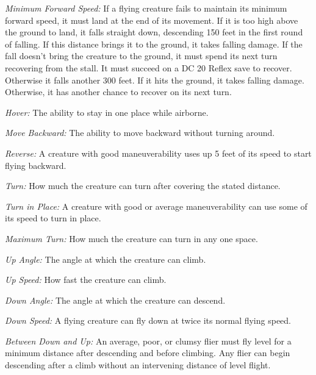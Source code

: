 \textit{Minimum Forward Speed:} If a flying creature fails to maintain its minimum 
forward speed, it must land at the end of its movement. If it is too high above 
the ground to land, it falls straight down, descending 150 feet in the first round 
of falling. If this distance brings it to the ground, it takes falling damage. 
If the fall doesn't bring the creature to the ground, it must spend its next turn 
recovering from the stall. It must succeed on a DC 20 Reflex save to recover. Otherwise 
it falls another 300 feet. If it hits the ground, it takes falling damage. Otherwise, 
it has another chance to recover on its next turn.

\textit{Hover:} The ability to stay in one place while airborne. 

\textit{Move Backward:} The ability to move backward without turning around.

\textit{Reverse:} A creature with good maneuverability uses up 5 feet of its speed 
to start flying backward.

\textit{Turn:} How much the creature can turn after covering the stated distance.

\textit{Turn in Place:} A creature with good or average maneuverability can use 
some of its speed to turn in place.

\textit{Maximum Turn:} How much the creature can turn in any one space. 

\textit{Up Angle:} The angle at which the creature can climb.

\textit{Up Speed:} How fast the creature can climb.

\textit{Down Angle:} The angle at which the creature can descend.

\textit{Down Speed:} A flying creature can fly down at twice its normal flying 
speed.

\textit{Between Down and Up:} An average, poor, or clumsy flier must fly level 
for a minimum distance after descending and before climbing. Any flier can begin 
descending after a climb without an intervening distance of level flight.

